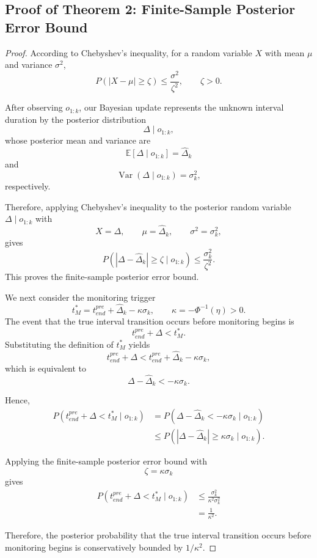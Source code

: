 \documentclass[letterpaper,10pt,onecolumn]{IEEEtran}
\begin{document}
\subsection{Proof of Theorem 2: Finite-Sample Posterior Error Bound}
\label{supp:proof_theorem2}
\begin{proof}
According to Chebyshev's inequality, for a random variable $X$ with
mean $\mu$ and variance $\sigma^2$,
\[
P\!\left(
|X-\mu|\geq\zeta
\right)
\leq
\frac{\sigma^2}{\zeta^2},
\qquad \zeta>0.
\]

After observing $o_{1:k}$, our Bayesian update represents the unknown
interval duration by the posterior distribution
\[
\Delta \mid o_{1:k},
\]
whose posterior mean and variance are
\[
\mathbb{E}\!\left[\Delta\mid o_{1:k}\right]
=
\hat{\Delta}_k
\]
and
\[
\operatorname{Var}\!\left(\Delta\mid o_{1:k}\right)
=
\sigma_k^2,
\]
respectively.

Therefore, applying Chebyshev's inequality to the posterior random
variable $\Delta\mid o_{1:k}$ with
\[
X=\Delta,\qquad
\mu=\hat{\Delta}_k,\qquad
\sigma^2=\sigma_k^2,
\]
gives
\[
P\!\left(
|\Delta-\hat{\Delta}_k|\geq\zeta
\mid o_{1:k}
\right)
\leq
\frac{\sigma_k^2}{\zeta^2}.
\]
This proves the finite-sample posterior error bound.

We next consider the monitoring trigger
\[
t_M^*
=
t_{end}^{pre}
+
\hat{\Delta}_k
-
\kappa\sigma_k,
\qquad
\kappa=-\Phi^{-1}(\eta)>0.
\]
The event that the true interval transition occurs before monitoring
begins is
\[
t_{end}^{pre}+\Delta<t_M^*.
\]
Substituting the definition of $t_M^*$ yields
\[
t_{end}^{pre}+\Delta
<
t_{end}^{pre}
+
\hat{\Delta}_k
-
\kappa\sigma_k,
\]
which is equivalent to
\[
\Delta-\hat{\Delta}_k
<
-\kappa\sigma_k.
\]

Hence,
\begin{align}
P\!\left(
t_{end}^{pre}+\Delta<t_M^*
\mid o_{1:k}
\right)
&=
P\!\left(
\Delta-\hat{\Delta}_k<-\kappa\sigma_k
\mid o_{1:k}
\right)\\
&\leq
P\!\left(
|\Delta-\hat{\Delta}_k|
\geq
\kappa\sigma_k
\mid o_{1:k}
\right).
\end{align}

Applying the finite-sample posterior error bound with
\[
\zeta=\kappa\sigma_k
\]
gives
\begin{align}
P\!\left(
t_{end}^{pre}+\Delta<t_M^*
\mid o_{1:k}
\right)
&\leq
\frac{\sigma_k^2}
{\kappa^2\sigma_k^2}\\
&=
\frac{1}{\kappa^2}.
\end{align}

Therefore, the posterior probability that the true interval transition
occurs before monitoring begins is conservatively bounded by
$1/\kappa^2$.
\end{proof}
\end{document}
